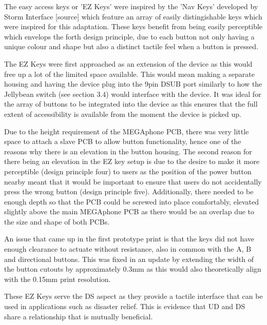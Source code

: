 The easy access keys or 'EZ Keys' were inspired by the 'Nav Keys' developed by Storm Interface [source] which feature an array of easily distingishable keys which were inspired for this adaptation.
These keys benefit from being easily perceptible which envelops the forth design principle, due to each button not only having a unique colour and shape but also a distinct tactile feel when a button is pressed.

The EZ Keys were first approached as an extension of the device as this would free up a lot of the limited space available.
This would mean making a separate housing and having the device plug into the 9pin DSUB port similarly to how the Jellybean switch (see section 3.4) would interface with the device.
It was ideal for the array of buttons to be integrated into the device as this ensures that the full extent of accessibility is available from the moment the device is picked up.

Due to the height requirement of the MEGAphone PCB, there was very little space to attach a slave PCB to allow button functionality, hence one of the reasons why there is an elevation in the button housing.
The second reason for there being an elevation in the EZ key setup is due to the desire to make it more perceptible (design principle four) to users as the position of the power button nearby meant that it would be important to ensure that users do not accidentally press the wrong button (design principle five).
Additionally, there needed to be enough depth so that the PCB could be screwed into place comfortably, elevated slightly above the main MEGAphone PCB as there would be an overlap due to the size and shape of both PCBs.

An issue that came up in the first prototype print is that the keys did not have enough clearance to actuate without resistance, also in common with the A, B and directional buttons.
This was fixed in an update by extending the width of the button cutouts by approximately 0.3mm as this would also theoretically align with the 0.15mm print resolution. %

These EZ Keys serve the DS aspect as they provide a tactile interface that can be used in applications such as disaster relief.
This is evidence that UD and DS share a relationship that is mutually beneficial.


